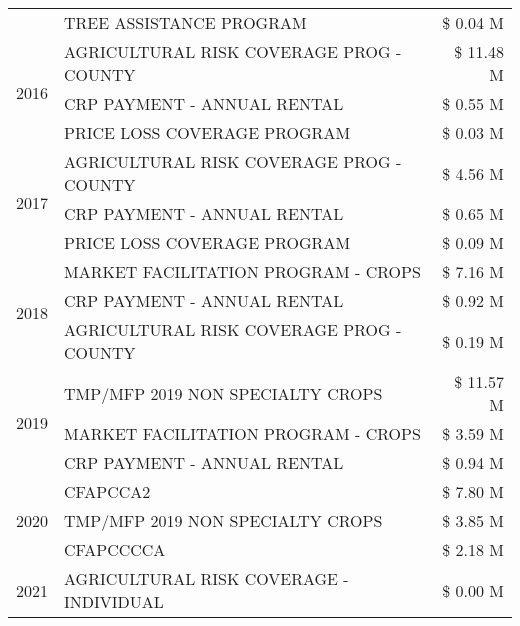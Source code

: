\begin{tabular}{llr}
 & TREE ASSISTANCE PROGRAM & \$ 0.04 M \\
\cline{1-3}
\multirow[t]{3}{*}{2016} & AGRICULTURAL RISK COVERAGE PROG - COUNTY      & \$ 11.48 M \\
 & CRP PAYMENT - ANNUAL RENTAL                   & \$ 0.55 M \\
 & PRICE LOSS COVERAGE PROGRAM                   & \$ 0.03 M \\
\cline{1-3}
\multirow[t]{3}{*}{2017} & AGRICULTURAL RISK COVERAGE PROG - COUNTY & \$ 4.56 M \\
 & CRP PAYMENT - ANNUAL RENTAL & \$ 0.65 M \\
 & PRICE LOSS COVERAGE PROGRAM & \$ 0.09 M \\
\cline{1-3}
\multirow[t]{3}{*}{2018} & MARKET FACILITATION PROGRAM - CROPS & \$ 7.16 M \\
 & CRP PAYMENT - ANNUAL RENTAL & \$ 0.92 M \\
 & AGRICULTURAL RISK COVERAGE PROG - COUNTY & \$ 0.19 M \\
\cline{1-3}
\multirow[t]{3}{*}{2019} & TMP/MFP 2019 NON SPECIALTY CROPS & \$ 11.57 M \\
 & MARKET FACILITATION PROGRAM - CROPS & \$ 3.59 M \\
 & CRP PAYMENT - ANNUAL RENTAL & \$ 0.94 M \\
\cline{1-3}
\multirow[t]{3}{*}{2020} & CFAPCCA2 & \$ 7.80 M \\
 & TMP/MFP 2019 NON SPECIALTY CROPS & \$ 3.85 M \\
 & CFAPCCCCA & \$ 2.18 M \\
\cline{1-3}
2021 & AGRICULTURAL RISK COVERAGE - INDIVIDUAL & \$ 0.00 M \\
\cline{1-3}
\bottomrule
\end{tabular}
